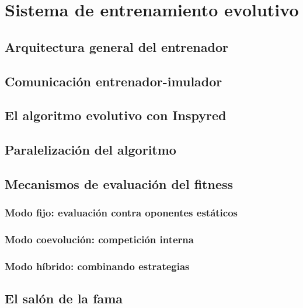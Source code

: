 \chapter{Sistema de entrenamiento evolutivo}

\section{Arquitectura general del entrenador}

\section{Comunicación entrenador-imulador}

\section{El algoritmo evolutivo con Inspyred}

\section{Paralelización del algoritmo}

\section{Mecanismos de evaluación del fitness}

\subsection{Modo fijo: evaluación contra oponentes estáticos}
\subsection{Modo coevolución: competición interna}
\subsection{Modo híbrido: combinando estrategias}
\section{El salón de la fama}
